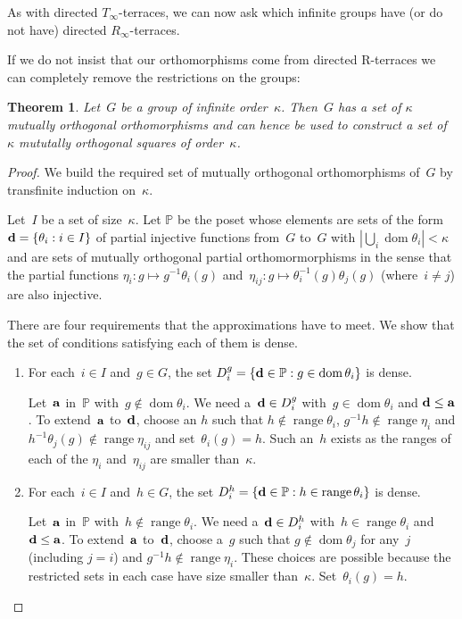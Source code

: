 \documentclass[12pt,a4paper]{article}
\newtheorem{thm}{Theorem}[section]
\DeclareMathOperator{\dom}{dom}
\DeclareMathOperator{\ran}{range}
\renewcommand{\P}{\mathbb{P}}
\renewcommand{\d}{\textup{\textbf{d}}}
\begin{document}
As with directed $T_{\infty}$-terraces, we can now ask which infinite groups have (or do not have) directed $R_{\infty}$-terraces.

If we do not insist that our orthomorphisms come from directed R-terraces we can completely remove the restrictions on the groups:

\begin{thm}
Let~$G$ be a group of infinite order~$\kappa$.  Then~$G$ has a set of $\kappa$ mutually orthogonal orthomorphisms and can hence be used to construct a set of~$\kappa$ mututally orthogonal squares of order~$\kappa$.
\end{thm}

\begin{proof}
We build the required set of mutually orthogonal orthomorphisms of~$G$ by transfinite induction on~$\kappa$.

Let~$I$ be a set of size~$\kappa$.  Let $\P$ be the poset whose elements are sets of the form~$\d=\{ \theta_i : i \in I \}$ of partial injective functions from~$G$ to~$G$ with $|\bigcup_{i} \dom \theta_i|  < \kappa$ and are sets of mutually orthogonal partial orthomormorphisms in the sense that the partial functions $\eta_i: g \mapsto g^{-1}\theta_i(g)$ and~$\eta_{ij}: g \mapsto \theta_i^{-1}(g)\theta_j(g)$ (where~$i \neq j$) are also injective.

There are four requirements that the approximations have to meet.  We show that the set of conditions satisfying each of them is dense.

\begin{enumerate}

\item For each~$i \in I$ and~$g \in G$, the set $D_i^g = \{ {\bf d} \in \P : g \in \dom \theta_i \}$ is dense.

Let~${\bf a}$ in~$\P$ with~$g \not\in \dom \theta_i$.  We need a~${\bf d} \in D_i^g$ with~$g \in \dom \theta_i$ and ${\bf d} \leq {\bf a}$.  To extend~${\bf a}$ to~${\bf d}$, choose an $h$ such that $h \not\in \ran \theta_i$, $g^{-1}h \not\in \ran \eta_i$ and $h^{-1}\theta_j(g) \not\in \ran \eta_{ij}$ and set~$\theta_i(g) = h$.  Such an~$h$ exists as the ranges of each of the $\eta_i$ and~$\eta_{ij}$ are smaller than~$\kappa$.


\item For each~$i \in I$ and~$h \in G$, the set $D_i^h = \{ {\bf d} \in \P : h \in \ran \theta_i \}$ is dense.

Let~${\bf a}$ in~$\P$ with~$h \not\in \ran \theta_i$.  We need a~${\bf d} \in D_i^h$ with~$h \in \ran \theta_i$ and ${\bf d} \leq {\bf a}$.  To extend~${\bf a}$ to~${\bf d}$, choose a~$g$ such that $g \not\in \dom \theta_j$ for any~$j$ (including $j=i$) and $g^{-1}h \not\in \ran \eta_i$.  These choices are possible because the restricted sets in each case have size smaller than~$\kappa$.
Set~$\theta_i(g) = h$.


\end{enumerate}
\end{proof}
\end{document}
